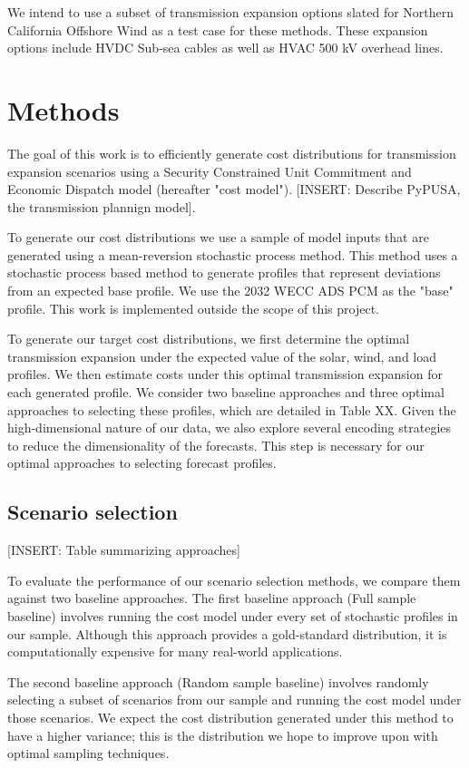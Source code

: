 \documentclass[10pt,twocolumn,letterpaper]{article}
\begin{document}
We intend to use a subset of transmission expansion options slated for Northern California Offshore Wind as a test case for these methods. These expansion options include HVDC Sub-sea cables as well as HVAC 500 kV overhead lines.

\section{Methods}
\label{sec:methods}
The goal of this work is to efficiently generate cost distributions for transmission expansion scenarios using a Security Constrained Unit Commitment and Economic Dispatch model (hereafter "cost model"). [INSERT: Describe PyPUSA, the transmission plannign model]. 

To generate our cost distributions we use a sample of model inputs that are generated using a mean-reversion stochastic process method. This method uses a stochastic process based method to generate profiles that represent deviations from an expected base profile. We use the 2032 WECC ADS PCM as the "base" profile. This work is implemented outside the scope of this project.

To generate our target cost distributions, we first determine the optimal transmission expansion under the expected value of the solar, wind, and load profiles. We then estimate costs under this optimal transmission expansion for each generated profile. We consider two baseline approaches and three optimal approaches to selecting these profiles, which are detailed in Table XX. Given the high-dimensional nature of our data, we also explore several encoding strategies to reduce the dimensionality of the forecasts. This step is necessary for our optimal approaches to selecting forecast profiles.


\subsection{Scenario selection}
[INSERT: Table summarizing approaches]

To evaluate the performance of our scenario selection methods, we compare them against two baseline approaches. The first baseline approach (Full sample baseline) involves running the cost model under every set of stochastic profiles in our sample. Although this approach provides a gold-standard distribution, it is computationally expensive for many real-world applications.

The second baseline approach (Random sample baseline) involves randomly selecting a subset of scenarios from our sample and running the cost model under those scenarios. We expect the cost distribution generated under this method to have a higher variance; this is the distribution we hope to improve upon with optimal sampling techniques.
\end{document}
